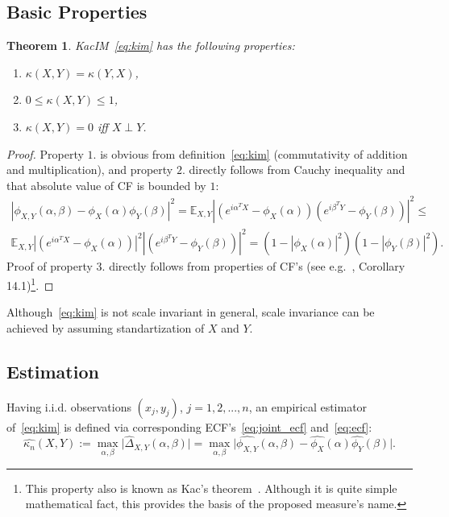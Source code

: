 \documentclass{article}
\newtheorem{theorem}{Theorem}
\begin{document}
{\subsection{Basic Properties}
\begin{theorem}
	\label{thm:properties}
	KacIM~\eqref{eq:kim} has the following properties:
	\begin{enumerate} 
		\item $\kappa(X,Y) = \kappa(Y,X)$,
		\item $0 \leq \kappa(X,Y) \leq 1$,
		\item $\kappa(X,Y) = 0$ iff $X\perp Y$.
	\end{enumerate}    
\end{theorem}


\begin{proof}
	Property $\textit{1.}$ is obvious from definition~\eqref{eq:kim} (commutativity of addition and multiplication), and property $\textit{2.}$ directly follows from Cauchy inequality and that absolute value of CF is bounded by $1$:
	\begin{multline*}
	|\phi_{X,Y}(\alpha, \beta)  -\phi_{X}(\alpha) \phi_{Y}(\beta)|^{2} =
	\mathbb{E}_{X,Y} |( e^{i\alpha^{T}X} - \phi_{X}(\alpha) )(e^{i\beta^{T}Y}- \phi_{Y}(\beta) )|^{2} \leq \\
	\mathbb{E}_{X,Y} |( e^{i\alpha^{T}X} - \phi_{X}(\alpha) )|^{2} |(e^{i\beta^{T}Y}- \phi_{Y}(\beta) )|^{2}  = (1 - |\phi_{X}(\alpha)|^{2}) (1 - |\phi_{Y}(\beta)|^{2}).
	\end{multline*}
	Proof of property $\textit{3.}$ directly follows from properties of CF's (see e.g.~\cite{Jacod}, Corollary 14.1)\footnote{This property also is known as Kac's theorem~\cite{KacTheorem}. Although it is quite simple mathematical fact, this provides the basis of the proposed measure's name.}.	
\end{proof}

Although~\eqref{eq:kim} is not scale invariant in general, scale invariance can be achieved by assuming standartization of $X$ and $Y$.


\subsection{Estimation}

Having i.i.d. observations $(x_{j}, y_{j})$, $j = 1,2,...,n$, an empirical estimator of~\eqref{eq:kim} is defined via corresponding ECF's~\eqref{eq:joint_ecf} and~\eqref{eq:ecf}:
\begin{equation}
\label{eq:estimator}
\widehat{\kappa_{n}}(X,Y) := \max_{\alpha, \beta} \vert \widehat{\Delta}_{X,Y}(\alpha, \beta) \vert =\max_{\alpha, \beta} \vert \widehat{\phi_{X,Y}}(\alpha,\beta)  - \widehat{\phi_{X}}(\alpha) \widehat{\phi_{Y}}(\beta) \vert.
\end{equation}

}
\end{document}
